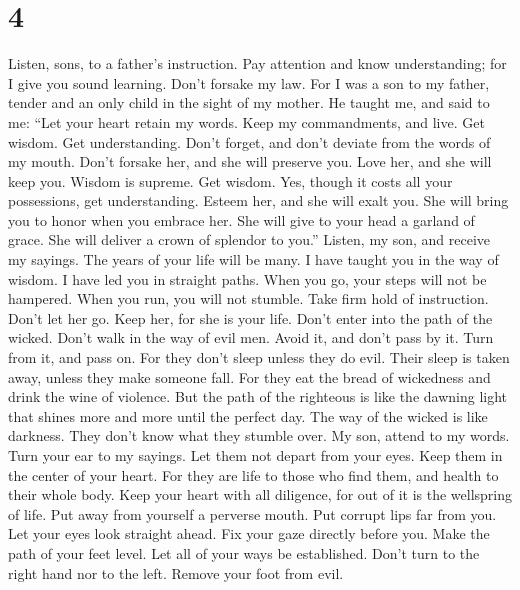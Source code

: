 \hypertarget{section-3}{%
\section{4}\label{section-3}}

 Listen, sons, to a father's instruction. Pay attention and
know understanding;  for I give you sound learning. Don't
forsake my law.  For I was a son to my father, tender and an
only child in the sight of my mother.  He taught me, and
said to me: ``Let your heart retain my words. Keep my commandments, and
live.  Get wisdom. Get understanding. Don't forget, and
don't deviate from the words of my mouth.  Don't forsake
her, and she will preserve you. Love her, and she will keep you.
 Wisdom is supreme. Get wisdom. Yes, though it costs all
your possessions, get understanding.  Esteem her, and she
will exalt you. She will bring you to honor when you embrace her.
 She will give to your head a garland of grace. She will
deliver a crown of splendor to you.''  Listen, my son, and
receive my sayings. The years of your life will be many.  I
have taught you in the way of wisdom. I have led you in straight paths.
 When you go, your steps will not be hampered. When you
run, you will not stumble.  Take firm hold of instruction.
Don't let her go. Keep her, for she is your life.  Don't
enter into the path of the wicked. Don't walk in the way of evil men.
 Avoid it, and don't pass by it. Turn from it, and pass on.
 For they don't sleep unless they do evil. Their sleep is
taken away, unless they make someone fall.  For they eat
the bread of wickedness and drink the wine of violence. 
But the path of the righteous is like the dawning light that shines more
and more until the perfect day.  The way of the wicked is
like darkness. They don't know what they stumble over.  My
son, attend to my words. Turn your ear to my sayings.  Let
them not depart from your eyes. Keep them in the center of your heart.
 For they are life to those who find them, and health to
their whole body.  Keep your heart with all diligence, for
out of it is the wellspring of life.  Put away from
yourself a perverse mouth. Put corrupt lips far from you. 
Let your eyes look straight ahead. Fix your gaze directly before you.
 Make the path of your feet level. Let all of your ways be
established.  Don't turn to the right hand nor to the left.
Remove your foot from evil.

